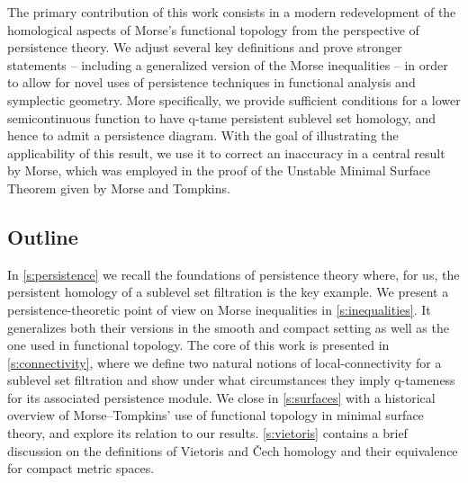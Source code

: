 The primary contribution of this work consists in 
a modern redevelopment of the homological aspects of Morse's functional topology from the perspective of persistence theory.
We adjust several key definitions and prove stronger statements -- including a generalized version of the Morse inequalities -- in order to allow for novel uses of persistence techniques in functional analysis and symplectic geometry.
More specifically, we provide sufficient conditions for a lower semicontinuous function to have q-tame persistent sublevel set homology, and hence to admit a persistence diagram.
With the goal of illustrating the applicability of this result, we use it to correct an inaccuracy in a central result by Morse, which was employed in the proof of the Unstable Minimal Surface Theorem given by Morse and Tompkins.

\subsection*{Outline}

In \cref{s:persistence} we recall the foundations of persistence theory where, for us, the persistent homology of a sublevel set filtration is the key example.
We present a persistence-theoretic point of view on Morse inequalities in \cref{s:inequalities}.
It generalizes both their versions in the smooth and compact setting as well as the one used in functional topology.
The core of this work is presented in \cref{s:connectivity}, where we define two natural notions of local-connectivity for a sublevel set filtration and show under what circumstances they imply q-tameness for its associated persistence module.
We close in \cref{s:surfaces} with a historical overview of Morse--Tompkins' use of functional topology in minimal surface theory, and explore its relation to our results.
\cref{s:vietoris} contains a brief discussion on the definitions of Vietoris and \v{C}ech homology and their equivalence for compact metric spaces.

